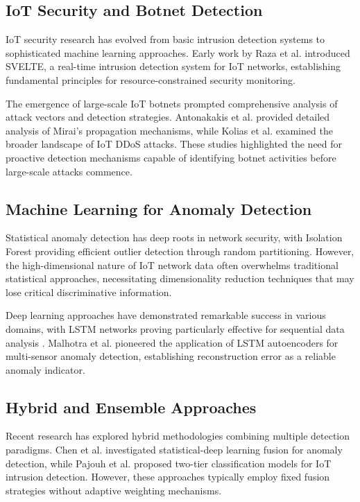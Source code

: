 \documentclass[conference]{IEEEtran}
\begin{document}
\subsection{IoT Security and Botnet Detection}

IoT security research has evolved from basic intrusion detection systems to sophisticated machine learning approaches. Early work by Raza et al. \cite{raza2013svelte} introduced SVELTE, a real-time intrusion detection system for IoT networks, establishing fundamental principles for resource-constrained security monitoring.

The emergence of large-scale IoT botnets prompted comprehensive analysis of attack vectors and detection strategies. Antonakakis et al. \cite{antonakakis2017understanding} provided detailed analysis of Mirai's propagation mechanisms, while Kolias et al. \cite{kolias2017ddos} examined the broader landscape of IoT DDoS attacks. These studies highlighted the need for proactive detection mechanisms capable of identifying botnet activities before large-scale attacks commence.

\subsection{Machine Learning for Anomaly Detection}

Statistical anomaly detection has deep roots in network security, with Isolation Forest \cite{liu2008isolation} providing efficient outlier detection through random partitioning. However, the high-dimensional nature of IoT network data often overwhelms traditional statistical approaches, necessitating dimensionality reduction techniques that may lose critical discriminative information.

Deep learning approaches have demonstrated remarkable success in various domains, with LSTM networks proving particularly effective for sequential data analysis \cite{hochreiter1997long}. Malhotra et al. \cite{malhotra2016lstm} pioneered the application of LSTM autoencoders for multi-sensor anomaly detection, establishing reconstruction error as a reliable anomaly indicator.

\subsection{Hybrid and Ensemble Approaches}

Recent research has explored hybrid methodologies combining multiple detection paradigms. Chen et al. \cite{chen2019fusion} investigated statistical-deep learning fusion for anomaly detection, while Pajouh et al. \cite{pajouh2019two} proposed two-tier classification models for IoT intrusion detection. However, these approaches typically employ fixed fusion strategies without adaptive weighting mechanisms.
\end{document}
